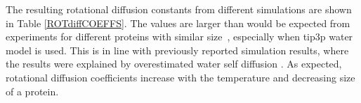 \documentclass[pre,aps,floatfix,authordate1-4,twocolumn]{revtex4-1}
\begin{document}
The resulting rotational diffusion constants from different simulations are
shown in Table \ref{ROTdiffCOEFFS}. The values are larger than would be
expected from experiments for different proteins with similar
size~\cite{krishnan98}, especially when tip3p water model is used.
This is in line with previously reported simulation results,
where the results were explained by overestimated water self
diffusion \cite{wong08}. As expected, rotational diffusion coefficients
increase with the temperature and decreasing size of a protein.

\end{document}
